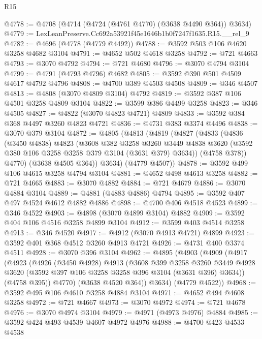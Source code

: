 \begin{lexlean}{R15}
\begin{coremodule}
@4778 := @4708 (@4714 (@4724 (@4761 @4770) (@3638 @4490 @364)) @3634)
@4779 := LexLeanPreserve.Cc692a53921f45e1646b1b0f7247f1635.R15.__rel_9
@4782 := @4696 (@4778 (@4779 @4492))
@4788 := @3592 @503 @106 @4620 @3258 @4682 @3104
@4791 := @4652 @502 @4618 @3258
@4792 := @721 @4663
@4793 := @3070 @4792
@4794 := @721 @4680
@4796 := @3070 @4794 @3104
@4799 := @4791 (@4793 @4796) @4682
@4805 := @3592 @390 @501 @4509 @4617 @4792 @4796
@4808 := @4700 @389 @4503 @4508
@4809 := @346 @4507
@4813 := @4808 (@3070 @4809 @3104) @4792
@4819 := @3592 @387 @106 @4501 @3258 @4809 @3104
@4822 := @3599 @386 @4499 @3258
@4823 := @346 @4505
@4827 := @4822 (@3070 @4823 @4721) @4809
@4833 := @3592 @384 @368 @4497 @3260 @4823 @4721
@4836 := @4731 @383 @3374 @4496
@4838 := @3070 @379 @3104
@4872 := @4805
    (@4813
      (@4819
        (@4827
          (@4833
            (@4836
              (@3450 @4838)
              @4823
              (@3608
                @382
                @3258
                @3260
                @3449
                @4838
                @3620
                (@3592 @380 @106 @3258 @3258 @379 @3104 (@3631 @379) @3634))
              (@4758 @378))
            @4770)
          (@3638 @4505 @364))
        @3634)
      (@4779 @4507))
@4878 := @3592 @499 @106 @4615 @3258 @4794 @3104
@4881 := @4652 @498 @4613 @3258
@4882 := @721 @4665
@4883 := @3070 @4882
@4884 := @721 @4679
@4886 := @3070 @4884 @3104
@4889 := @4881 (@4883 @4886) @4794
@4895 := @3592 @407 @497 @4524 @4612 @4882 @4886
@4898 := @4700 @406 @4518 @4523
@4899 := @346 @4522
@4903 := @4898 (@3070 @4899 @3104) @4882
@4909 := @3592 @404 @106 @4516 @3258 @4899 @3104
@4912 := @3599 @403 @4514 @3258
@4913 := @346 @4520
@4917 := @4912 (@3070 @4913 @4721) @4899
@4923 := @3592 @401 @368 @4512 @3260 @4913 @4721
@4926 := @4731 @400 @3374 @4511
@4928 := @3070 @396 @3104
@4962 := @4895
    (@4903
      (@4909
        (@4917
          (@4923
            (@4926
              (@3450 @4928)
              @4913
              (@3608
                @399
                @3258
                @3260
                @3449
                @4928
                @3620
                (@3592 @397 @106 @3258 @3258 @396 @3104 (@3631 @396) @3634))
              (@4758 @395))
            @4770)
          (@3638 @4520 @364))
        @3634)
      (@4779 @4522))
@4968 := @3592 @495 @106 @4610 @3258 @4884 @3104
@4971 := @4652 @494 @4608 @3258
@4972 := @721 @4667
@4973 := @3070 @4972
@4974 := @721 @4678
@4976 := @3070 @4974 @3104
@4979 := @4971 (@4973 @4976) @4884
@4985 := @3592 @424 @493 @4539 @4607 @4972 @4976
@4988 := @4700 @423 @4533 @4538

\end{coremodule}
\end{lexlean}
